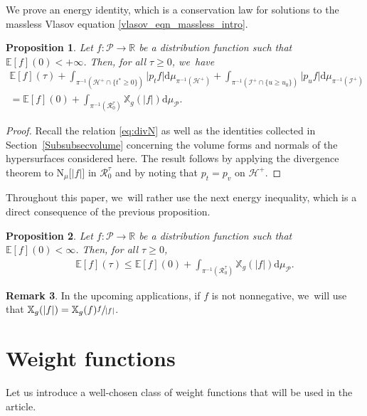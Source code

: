 \documentclass[10pt]{amsart}
\theoremstyle{plain}
\newtheorem{proposition}{Proposition}[section]
\theoremstyle{definition}
\newtheorem{remark}[proposition]{Remark}
\newcommand\R{{\mathbb{R}}}
\newcommand\T{{\mathbb{X}}}
\newcommand\dr{{\mathrm{d}}}
\begin{document}
We prove an energy identity, which is a conservation law for solutions to the massless Vlasov equation \eqref{vlasov_eqn_massless_intro}.

\begin{proposition}\label{Proenergy0}
Let $f \colon \mathcal{P} \to \R$ be a distribution function such that $\mathbb{E}[f](0)<+\infty$. Then, for all $ \tau \geq 0$, we~have
\begin{multline*}
\mathbb{E}[f](\tau)+ \int_{\pi^{-1 } (\mathcal{H}^+ \cap \{t^* \geq 0 \})} \big| p_t f \big| \dr \mu_{ \pi^{-1 } (\mathcal{H}^+)}+ \int_{\pi^{-1 } (\mathcal{I}^+ \cap \{u \geq u_0 \})} \big| p_u f \big| \dr \mu_{ \pi^{-1 } (\mathcal{I}^+)}\\
= \mathbb{E}[f](0)+ \int_{\pi^{-1} (\mathcal{R}_0^\tau) } \T_g (|f|) \dr \mu_{\mathcal{P}}.
\end{multline*}
\end{proposition}
\begin{proof}
Recall the relation \eqref{eq:divN} as well as the identities collected in Section~\ref{Subsubsecvolume} concerning the volume forms and normals of the hypersurfaces considered here. The result follows by applying the divergence theorem to $\mathrm{N}_{\mu}\bigl[|f| \bigr]$ in $ \mathcal{R}_0^\tau $ and by noting that $p_t=p_v$ on $\mathcal{H}^+$.
\end{proof}

Throughout this paper, we~will rather use the next energy inequality, which is a direct consequence of the previous proposition.
\begin{proposition}\label{Proenergy}
Let $f \colon \mathcal{P} \to \R$ be a distribution function such that $\mathbb{E}[f](0)<\infty$. Then, for all $ \tau \geq 0$,
\begin{align*}
\mathbb{E}[f](\tau) \leq \mathbb{E}[f](0)+\int_{\pi^{-1} (\mathcal{R}_0^\tau) } \T_g (|f|) \dr \mu_{\mathcal{P}}.
\end{align*}
\end{proposition}
\begin{remark}
In the upcoming applications, if $f$ is not nonnegative, we~will use that $\T_g(|f|)=\T_g(f)\sfrac{f}{|f|}$.
\end{remark}

\section{Weight functions}\label{Sec3}

Let us introduce a well-chosen class of weight functions that will be used in the article.
\end{document}
